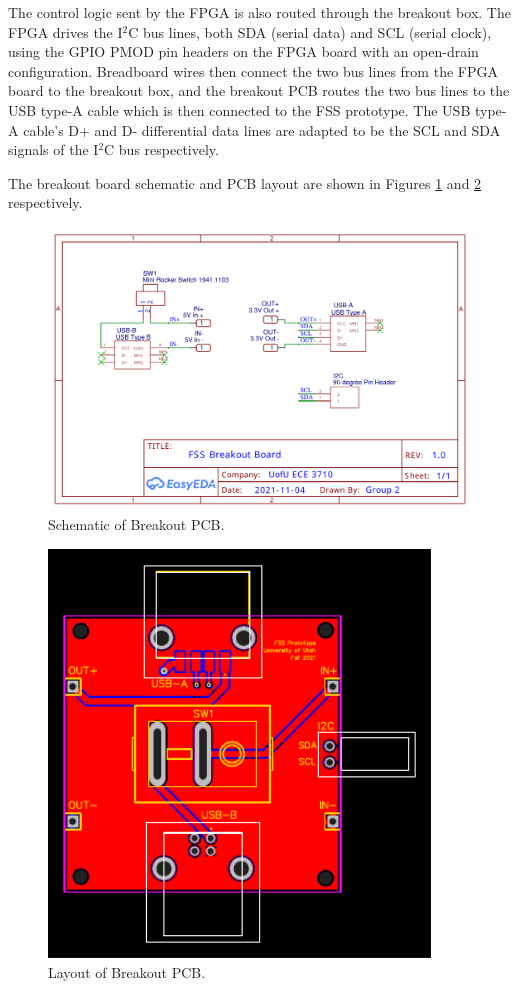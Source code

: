 \documentclass[conference]{IEEEtran}
\begin{document}
The control logic sent by the FPGA is also routed through the breakout box. The FPGA drives the I$^2$C bus lines, both SDA (serial data) and SCL (serial clock), using the GPIO PMOD pin headers on the FPGA board with an open-drain configuration. Breadboard wires then connect the two bus lines from the FPGA board to the breakout box, and the breakout PCB routes the two bus lines to the USB type-A cable which is then connected to the FSS prototype. The USB type-A cable's D+ and D- differential data lines are adapted to be the SCL and SDA signals of the I$^2$C bus respectively.

The breakout board schematic and PCB layout are shown in Figures \ref{fig:breakout_schematic} and \ref{fig:breakout_pcb} respectively.

\begin{figure}[bhtp]
    \centering
    \includegraphics[width=4.5in]{./resources/figures/breakout_schematic.pdf}
    \caption{Schematic of Breakout PCB.}
    \label{fig:breakout_schematic}
\end{figure}

\begin{figure}[bhtp]
    \centering
    \includegraphics[width=4in]{./resources/figures/breakout_pcb.pdf}
    \caption{Layout of Breakout PCB.}
    \label{fig:breakout_pcb}
\end{figure}
\end{document}
